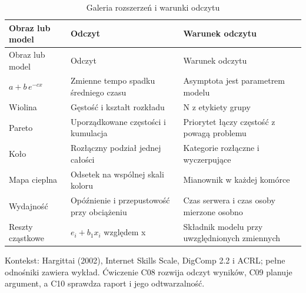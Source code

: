 \documentclass[
  polish,
  11pt,
  a4paper,
]{article}
\begin{document}
\begin{longtable}[]{@{}
  >{\raggedright\arraybackslash}p{}
  >{\raggedright\arraybackslash}p{}
  >{\raggedright\arraybackslash}p{}@{}}
\caption{Galeria rozszerzeń i warunki odczytu}\tabularnewline
\toprule\noalign{}
\begin{minipage}[b]{\linewidth}\raggedright
Obraz lub model
\end{minipage} & \begin{minipage}[b]{\linewidth}\raggedright
Odczyt
\end{minipage} & \begin{minipage}[b]{\linewidth}\raggedright
Warunek odczytu
\end{minipage} \\
\midrule\noalign{}
\endfirsthead
\toprule\noalign{}
\begin{minipage}[b]{\linewidth}\raggedright
Obraz lub model
\end{minipage} & \begin{minipage}[b]{\linewidth}\raggedright
Odczyt
\end{minipage} & \begin{minipage}[b]{\linewidth}\raggedright
Warunek odczytu
\end{minipage} \\
\midrule\noalign{}
\endhead
\bottomrule\noalign{}
\endlastfoot
\(a+b\,e^{-cx}\) & Zmienne tempo spadku średniego czasu & Asymptota jest
parametrem modelu \\
Wiolina & Gęstość i kształt rozkładu & N z etykiety grupy \\
Pareto & Uporządkowane częstości i kumulacja & Priorytet łączy częstość
z powagą problemu \\
Koło & Rozłączny podział jednej całości & Kategorie rozłączne i
wyczerpujące \\
Mapa cieplna & Odsetek na wspólnej skali koloru & Mianownik w każdej
komórce \\
Wydajność & Opóźnienie i przepustowość przy obciążeniu & Czas serwera i
czas osoby mierzone osobno \\
Reszty cząstkowe & \(e_i+b_1x_i\) względem x & Składnik modelu przy
uwzględnionych zmiennych \\
\end{longtable}

Kontekst: Hargittai (2002), Internet Skills Scale, DigComp 2.2 i ACRL;
pełne odnośniki zawiera wykład. Ćwiczenie C08 rozwija odczyt wyników,
C09 planuje argument, a C10 sprawdza raport i jego odtwarzalność.
\end{document}
